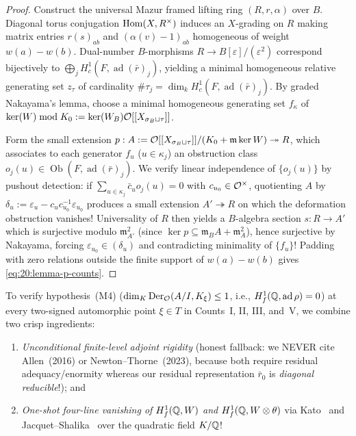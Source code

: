 \begin{proof}
Construct the universal Mazur framed lifting ring $(R, r, \alpha)$ over $B$. Diagonal torus conjugation $\mathrm{Hom}(X, R^\times)$ induces an $X$-grading on $R$ making matrix entries $r(s)_{ab}$ and $(\alpha(v) - 1)_{ab}$ homogeneous of weight $w(a) - w(b)$. Dual-number $B$-morphisms $R \to B[\varepsilon]/(\varepsilon^2)$ correspond bijectively to $\bigoplus_j H^1_c(F, \operatorname{ad}(\bar{r})_j)$, yielding a minimal homogeneous relative generating set $z_\tau$ of cardinality $\#\tau_j = \dim_k H^1_c(F, \operatorname{ad}(\bar{r})_j)$. By graded Nakayama's lemma, choose a minimal homogeneous generating set $f_\kappa$ of $\ker(W) \bmod K_0 := \ker(W_B)\mathcal{O}[[X_{\sigma_B\sqcup\tau}]]$.

Form the small extension $p : A := \mathcal{O}[[X_{\sigma_B\sqcup\tau}]] / (K_0 + \mathfrak{m}\ker W) \twoheadrightarrow R$, which associates to each generator $f_u$ ($u \in \kappa_j$) an obstruction class $o_j(u) \in \operatorname{Ob}(F, \operatorname{ad}(\bar{r})_j)$. We verify linear independence of $\{o_j(u)\}$ by pushout detection: if $\sum_{u \in \kappa_j} \bar{c}_u o_j(u) = 0$ with $c_{u_0} \in \mathcal{O}^\times$, quotienting $A$ by $\delta_u := \varepsilon_u - c_u c_{u_0}^{-1}\varepsilon_{u_0}$ produces a small extension $A' \twoheadrightarrow R$ on which the deformation obstruction vanishes! Universality of $R$ then yields a $B$-algebra section $s : R \to A'$ which is surjective modulo $\mathfrak{m}_{A'}^2$ (since $\ker p \subseteq \mathfrak{m}_B A + \mathfrak{m}_A^2$), hence surjective by Nakayama, forcing $\varepsilon_{u_0} \in (\delta_u)$ and contradicting minimality of $\{f_u\}$! Padding with zero relations outside the finite support of $w(a) - w(b)$ gives \eqref{eq:20:lemma-p-counts}.
\end{proof}

To verify hypothesis~(M4) ($\dim_K \operatorname{Der}_{\mathcal{O}}(A/I, K_\xi) \le 1$, i.e., $H^1_f(\mathbb{Q}, \operatorname{ad}\rho) = 0$) at every two-signed automorphic point $\xi \in T$ in Counts~I, II, III, and~V, we combine two crisp ingredients:
\begin{enumerate}[label=(\arabic*)]
\item \emph{Unconditional finite-level adjoint rigidity} (honest fallback: we NEVER cite Allen~(2016) or Newton--Thorne~(2023), because both require residual adequacy/enormity whereas our residual representation $\bar{r}_0$ is \emph{diagonal reducible}!); and
\item \emph{One-shot four-line vanishing of $H^1_f(\mathbb{Q}, W)$ and $H^1_f(\mathbb{Q}, W \otimes \theta)$} via Kato~\cite[Theorem~14.2(1)]{Kato2004} and Jacquet--Shalika~\cite[Theorem~1]{JacquetShalika1976} over the quadratic field $K/\mathbb{Q}$!
\end{enumerate}

